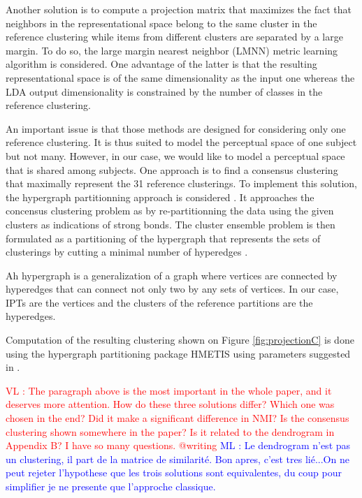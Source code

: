 \documentclass{article}
\newcommand{\ipts}{IPTs\xspace}
\newcommand{\ml}[1]{\textcolor{blue}{ML : #1}}
\newcommand{\vl}[1]{\textcolor{red}{VL : #1}}
\begin{document}
Another solution is to compute a projection matrix that maximizes the fact that neighbors in the representational space belong to the same cluster in the reference clustering while items from different clusters are separated by a large margin. To do so, the large margin nearest neighbor (LMNN) metric learning algorithm \cite{weinberger2006distance, weinberger2009distance} is considered. One advantage of the latter is that the resulting representational space is of the same dimensionality as the input one whereas the LDA output dimensionality is constrained by the number of classes in the reference clustering.

An important issue is that those methods are designed for considering only one reference clustering. It is thus suited to model the perceptual space of one subject but not many. However, in our case, we would like to model a perceptual space that is shared among subjects. One approach is to find a consensus clustering that maximally represent the 31 reference clusterings. To implement this solution, the hypergraph partitionning approach is considered \cite{kernighan1970efficient}. It approaches the concensus clustering problem as by re-partitionning the data
using the given clusters as indications of strong bonds. The cluster ensemble problem is then
formulated as a partitioning of the hypergraph that represents the sets of clusterings by cutting a minimal number of hyperedges \cite{strehl2002cluster}.

Ah hypergraph is a generalization of a graph where vertices are connected by hyperedges that can connect not only two by any sets of vertices. In our case, \ipts are the vertices and the clusters of the reference partitions are the hyperedges.

Computation of the resulting clustering shown on Figure \ref{fig:projectionC} is done using the hypergraph partitioning package HMETIS \cite{han1997scalable} using parameters suggested in \cite{strehl2002cluster}.

\vl{The paragraph above is the most important in the whole paper, and it deserves more attention. How do these three solutions differ? Which one was chosen in the end? Did it make a significant difference in NMI? Is the consensus clustering shown somewhere in the paper? Is it related to the dendrogram in Appendix B? I have so many questions. @writing}
\ml{Le dendrogram n'est pas un clustering, il part de la matrice de similarité. Bon apres, c'est tres lié...On ne peut rejeter l'hypothese que les trois solutions sont equivalentes, du coup pour simplifier je ne presente que l'approche classique.}
\end{document}

